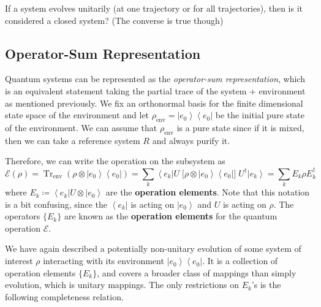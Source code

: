 \documentclass{article}
\DeclareMathOperator{\Tr}{Tr}
\newcommand{\ket}[1]{\ensuremath{\left|#1\right\rangle}}
\newcommand{\bra}[1]{\ensuremath{\left\langle#1\right|}}
\begin{document}
    \begin{question}
      If a system evolves unitarily (at one trajectory or for all trajectories), then is it considered a closed system? (The converse is true though)
    \end{question}

  \subsection{Operator-Sum Representation} 

    Quantum systems can be represented as the \textit{operator-sum representation}, which is an equivalent statement taking the partial trace of the system + environment as mentioned previously. We fix an orthonormal basis for the finite dimensional state space of the environment and let $\rho_{\mathrm{env}} = \ket{e_0} \bra{e_0}$ be the initial pure state of the environment. We can assume that $\rho_{\mathrm{env}}$ is a pure state since if it is mixed, then we can take a reference system $R$ and always purify it. 

    \begin{definition}
      Therefore, we can write the operation on the subsystem as
      \begin{equation}
        \mathcal{E} (\rho) = \Tr_{\mathrm{env}}(\rho \otimes \ket{e_0} \bra{e_0}) = \sum_{k} \bra{e_k} U \; \big[ \rho \otimes \ket{e_0} \bra{e_0} \big] \; U^\dagger \ket{e_k} = \sum_{k} E_k \rho E_k^\dagger
      \end{equation}
      where $E_k \coloneqq \bra{e_k} U \otimes \ket{e_0}$ are the \textbf{operation elements}. Note that this notation is a bit confusing, since the $\bra{e_k}$ is acting on $\ket{e_0}$ and $U$ is acting on $\rho$. The operators $\{E_k\}$ are known as the \textbf{operation elements} for the quantum operation $\mathcal{E}$. 
    \end{definition}

    We have again described a potentially non-unitary evolution of some system of interest $\rho$ interacting with its environment $\ket{e_0} \bra{e_0}$. It is a collection of operation elements $\{E_k\}$, and covers a broader class of mappings than simply evolution, which is unitary mappings. The only restrictions on $E_k$'s is the following completeness relation. 
\end{document}
